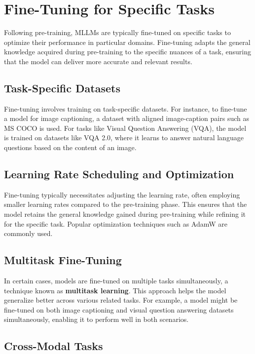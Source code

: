 \section{Fine-Tuning for Specific Tasks}

Following pre-training, MLLMs are typically fine-tuned on specific tasks to optimize their performance in particular domains. Fine-tuning adapts the general knowledge acquired during pre-training to the specific nuances of a task, ensuring that the model can deliver more accurate and relevant results.

\subsection{Task-Specific Datasets}

Fine-tuning involves training on task-specific datasets. For instance, to fine-tune a model for image captioning, a dataset with aligned image-caption pairs such as MS COCO is used. For tasks like Visual Question Answering (VQA), the model is trained on datasets like VQA 2.0, where it learns to answer natural language questions based on the content of an image.

\subsection{Learning Rate Scheduling and Optimization}

Fine-tuning typically necessitates adjusting the learning rate, often employing smaller learning rates compared to the pre-training phase. This ensures that the model retains the general knowledge gained during pre-training while refining it for the specific task. Popular optimization techniques such as AdamW are commonly used.

\subsection{Multitask Fine-Tuning}

In certain cases, models are fine-tuned on multiple tasks simultaneously, a technique known as \textbf{multitask learning}. This approach helps the model generalize better across various related tasks. For example, a model might be fine-tuned on both image captioning and visual question answering datasets simultaneously, enabling it to perform well in both scenarios.

\subsection{Cross-Modal Tasks}

